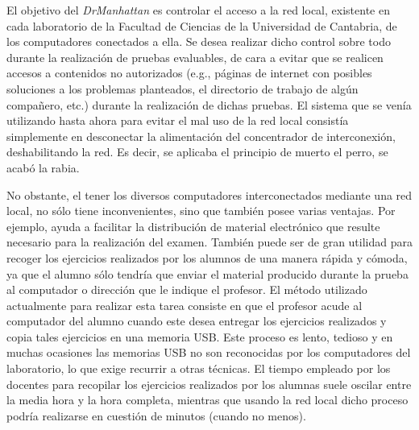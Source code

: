 El objetivo del \emph{DrManhattan} es controlar el acceso a la red local, existente en cada laboratorio de la Facultad de Ciencias de la Universidad de Cantabria, de los computadores conectados a ella.
%
Se desea realizar dicho control sobre todo durante la realización de pruebas evaluables, de cara a evitar que se realicen accesos a contenidos no autorizados (e.g., páginas de internet con posibles soluciones a los problemas planteados, el directorio de trabajo de algún compañero, etc.) durante la realización de dichas pruebas. El sistema que se venía utilizando hasta ahora para evitar el mal uso de la red local consistía simplemente en desconectar la alimentación del concentrador de interconexión, deshabilitando la red. Es decir, se aplicaba el principio de muerto el perro, se acabó la rabia.
\newline

No obstante, el tener los diversos computadores interconectados mediante una red local, no sólo tiene inconvenientes, sino que también posee varias ventajas. Por ejemplo, ayuda a facilitar la distribución de material electrónico que resulte necesario para la realización del examen. También puede ser de gran utilidad para recoger los ejercicios realizados por los alumnos de una manera rápida y cómoda, ya que el alumno sólo tendría que enviar el material producido durante la prueba al computador o dirección que le indique el profesor. El método utilizado actualmente para realizar esta tarea consiste en que el profesor acude al computador del alumno cuando este desea entregar los ejercicios realizados y copia tales ejercicios en una memoria USB. Este proceso es lento, tedioso y en muchas ocasiones las memorias USB no son reconocidas por los computadores del laboratorio, lo que exige recurrir a otras técnicas. El tiempo empleado por los docentes para recopilar los ejercicios realizados por los alumnas suele oscilar entre la media hora y la hora completa, mientras que usando la red local dicho proceso podría realizarse en cuestión de minutos (cuando no menos).
\newline

